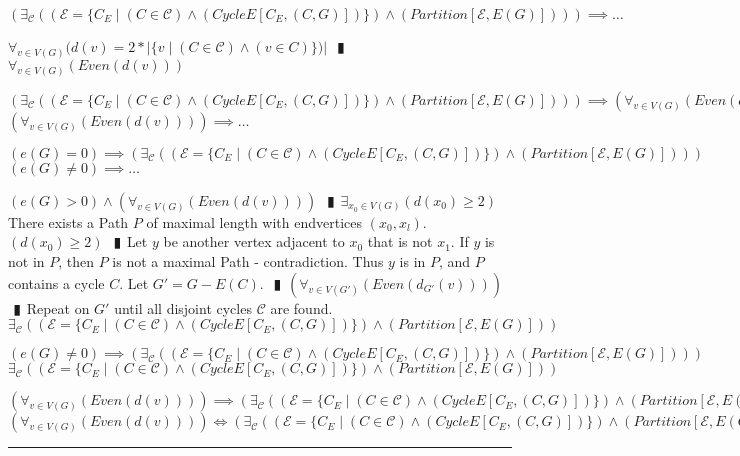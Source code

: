 \documentclass{book}
\newcommand{\pipe}{$\phantom{(}\vrectangleblack\phantom{)}$}
\newcommand{\st}{\mathbin{|}}
\begin{document}
\begin{enumerate}
  \lit $(\exists_{\mathcal{C}}((\mathcal{E} = \{C_E \st (C \in \mathcal{C}) \land (CycleE[C_E, (C, G)])\}) \land (Partition[\mathcal{E}, E(G)]))) \implies \ldots$
  \begin{enumerate}
    \lit $\forall_{v \in V(G)}(d(v) = 2 * |\{v \st (C \in \mathcal{C}) \land (v \in C)\})|$ \pipe $\forall_{v \in V(G)}(Even(d(v)))$
  \end{enumerate}
  \lit $(\exists_{\mathcal{C}}((\mathcal{E} = \{C_E \st (C \in \mathcal{C}) \land (CycleE[C_E, (C, G)])\}) \land (Partition[\mathcal{E}, E(G)]))) \implies (\forall_{v \in V(G)}(Even(d(v))))$
  \lit $(\forall_{v \in V(G)}(Even(d(v)))) \implies \ldots$
  \begin{enumerate}
    \lit $(e(G) = 0) \implies (\exists_{\mathcal{C}}((\mathcal{E} = \{C_E \st (C \in \mathcal{C}) \land (CycleE[C_E, (C, G)])\}) \land (Partition[\mathcal{E}, E(G)])))$
    \lit $(e(G) \neq 0) \implies \ldots$
    \begin{enumerate}
      \lit $(e(G) > 0) \land (\forall_{v \in V(G)}(Even(d(v))))$ \pipe $\exists_{x_0 \in V(G)}(d(x_0) \geq 2)$
      \lit There exists a Path $P$ of maximal length with endvertices $(x_0, x_l)$.
      \lit $(d(x_0) \geq 2)$ \pipe Let $y$ be another vertex adjacent to $x_0$ that is not $x_1$.
      \lit If $y$ is not in $P$, then $P$ is not a maximal Path - contradiction.
      \lit Thus $y$ is in $P$, and $P$ contains a cycle $C$.
      \lit Let $G' = G - E(C)$. \pipe $(\forall_{v \in V(G')}(Even(d_{G'}(v))))$ \pipe Repeat on $G'$ until all disjoint cycles $\mathcal{C}$ are found.
      \lit $\exists_{\mathcal{C}}((\mathcal{E} = \{C_E \st (C \in \mathcal{C}) \land (CycleE[C_E, (C, G)])\}) \land (Partition[\mathcal{E}, E(G)]))$
    \end{enumerate}
    \lit $(e(G) \neq 0) \implies (\exists_{\mathcal{C}}((\mathcal{E} = \{C_E \st (C \in \mathcal{C}) \land (CycleE[C_E, (C, G)])\}) \land (Partition[\mathcal{E}, E(G)])))$
    \lit $\exists_{\mathcal{C}}((\mathcal{E} = \{C_E \st (C \in \mathcal{C}) \land (CycleE[C_E, (C, G)])\}) \land (Partition[\mathcal{E}, E(G)]))$
  \end{enumerate}
  \lit $(\forall_{v \in V(G)}(Even(d(v)))) \implies (\exists_{\mathcal{C}}((\mathcal{E} = \{C_E \st (C \in \mathcal{C}) \land (CycleE[C_E, (C, G)])\}) \land (Partition[\mathcal{E}, E(G)])))$
  \lit $(\forall_{v \in V(G)}(Even(d(v)))) \iff (\exists_{\mathcal{C}}((\mathcal{E} = \{C_E \st (C \in \mathcal{C}) \land (CycleE[C_E, (C, G)])\}) \land (Partition[\mathcal{E}, E(G)])))$
\end{enumerate} \vspace{.75mm} \hrule \vspace{.75mm} \ \\ 
\end{document}
